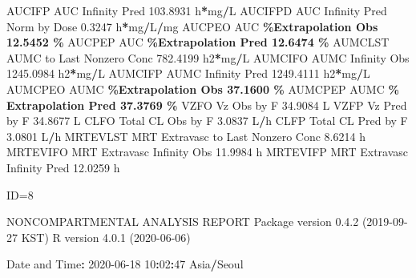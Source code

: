 \documentclass[
  10pt,
]{krantz}
\makeatletter
\newenvironment{Shaded}{\begin{snugshade}}{\end{snugshade}}
\newcommand{\DecValTok}[1]{\textcolor[rgb]{0.00,0.00,0.81}{#1}}
\newcommand{\FloatTok}[1]{\textcolor[rgb]{0.00,0.00,0.81}{#1}}
\newcommand{\NormalTok}[1]{#1}
\newcommand{\OperatorTok}[1]{\textcolor[rgb]{0.81,0.36,0.00}{\textbf{#1}}}
\newcommand{\StringTok}[1]{\textcolor[rgb]{0.31,0.60,0.02}{#1}}
\newenvironment{kframe}{%
\medskip{}
\setlength{\fboxsep}{.8em}
 \def\at@end@of@kframe{}%
 \ifinner\ifhmode%
  \def\at@end@of@kframe{\end{minipage}}%
  \begin{minipage}{\columnwidth}%
 \fi\fi%
 \def\FrameCommand##1{\hskip\@totalleftmargin \hskip-\fboxsep
 \colorbox{shadecolor}{##1}\hskip-\fboxsep
     \hskip-\linewidth \hskip-\@totalleftmargin \hskip\columnwidth}%
 \MakeFramed {\advance\hsize-\width
   \@totalleftmargin\z@ \linewidth\hsize
   \@setminipage}}%
 {\par\unskip\endMakeFramed%
 \at@end@of@kframe}
\renewenvironment{Shaded}{\begin{kframe}}{\end{kframe}}
\makeatother
\begin{document}
\begin{Shaded}
\begin{Highlighting}[]
\NormalTok{AUCIFP     AUC Infinity Pred                             }\FloatTok{103.8931}\NormalTok{ h}\OperatorTok{*}\NormalTok{mg}\OperatorTok{/}\NormalTok{L}
\NormalTok{AUCIFPD    AUC Infinity Pred Norm by Dose                  }\FloatTok{0.3247}\NormalTok{ h}\OperatorTok{*}\NormalTok{mg}\OperatorTok{/}\NormalTok{L}\OperatorTok{/}\NormalTok{mg}
\NormalTok{AUCPEO     AUC }\OperatorTok{\%Extrapolation Obs                         12.5452 \%}
\NormalTok{AUCPEP     AUC }\OperatorTok{\%Extrapolation Pred                        12.6474 \%}
\NormalTok{AUMCLST    AUMC to Last Nonzero Conc                     }\FloatTok{782.4199}\NormalTok{ h2}\OperatorTok{*}\NormalTok{mg}\OperatorTok{/}\NormalTok{L}
\NormalTok{AUMCIFO    AUMC Infinity Obs                            }\FloatTok{1245.0984}\NormalTok{ h2}\OperatorTok{*}\NormalTok{mg}\OperatorTok{/}\NormalTok{L}
\NormalTok{AUMCIFP    AUMC Infinity Pred                           }\FloatTok{1249.4111}\NormalTok{ h2}\OperatorTok{*}\NormalTok{mg}\OperatorTok{/}\NormalTok{L}
\NormalTok{AUMCPEO    AUMC }\OperatorTok{\%Extrapolation Obs                        37.1600 \%}
\NormalTok{AUMCPEP    AUMC }\OperatorTok{\% Extrapolation Pred                      37.3769 \%}
\NormalTok{VZFO       Vz Obs by F                                    }\FloatTok{34.9084}\NormalTok{ L}
\NormalTok{VZFP       Vz Pred by F                                   }\FloatTok{34.8677}\NormalTok{ L}
\NormalTok{CLFO       Total CL Obs by F                               }\FloatTok{3.0837}\NormalTok{ L}\OperatorTok{/}\NormalTok{h}
\NormalTok{CLFP       Total CL Pred by F                              }\FloatTok{3.0801}\NormalTok{ L}\OperatorTok{/}\NormalTok{h}
\NormalTok{MRTEVLST   MRT Extravasc to Last Nonzero Conc              }\FloatTok{8.6214}\NormalTok{ h}
\NormalTok{MRTEVIFO   MRT Extravasc Infinity Obs                     }\FloatTok{11.9984}\NormalTok{ h}
\NormalTok{MRTEVIFP   MRT Extravasc Infinity Pred                    }\FloatTok{12.0259}\NormalTok{ h}





\NormalTok{ID=}\DecValTok{8}

\NormalTok{                        NONCOMPARTMENTAL ANALYSIS REPORT}
\NormalTok{                       Package version }\DecValTok{0}\NormalTok{.}\FloatTok{4.2}\NormalTok{ (}\DecValTok{2019{-}09{-}27}\NormalTok{ KST)}
\NormalTok{                          R version }\DecValTok{4}\NormalTok{.}\FloatTok{0.1}\NormalTok{ (}\DecValTok{2020{-}06{-}06}\NormalTok{)}

\NormalTok{Date and Time}\OperatorTok{:}\StringTok{ }\DecValTok{2020{-}06{-}18} \DecValTok{10}\OperatorTok{:}\DecValTok{02}\OperatorTok{:}\DecValTok{47}\NormalTok{ Asia}\OperatorTok{/}\NormalTok{Seoul}


\end{Highlighting}
\end{Shaded}
\end{document}

